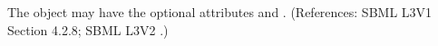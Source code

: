 The  object may have the optional attributes   and
. (References: SBML L3V1 Section 4.2.8; SBML L3V2 .)
